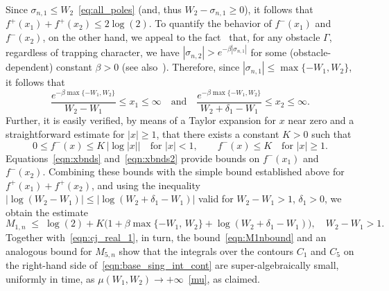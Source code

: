\documentclass[11pt]{article}
\theoremstyle{plain}
\theoremstyle{remark}
\begin{document}
Since $\sigma_{n,1} \le W_2$~\eqref{eq:all_poles} (and, thus
$W_2 -\sigma_{n,1}\geq 0$), it follows that
$f^+(x_1) + f^+(x_2) \le 2\log(2)$. To quantify the behavior of
$f^-(x_1)$ and $f^-(x_2)$, on the other hand, we appeal to the
fact~\cite{burq1998decroissance} that, for any obstacle $\Gamma$,
regardless of trapping character, we have
$|\sigma_{n,2}| > e^{-\beta |\sigma_{n,1}|}$ for some (obstacle-dependent)
constant $\beta > 0$ (see
also~\cite[Sec. 2.4]{zworski2017mathematical}). Therefore, since
$|\sigma_{n,1}|\leq \max\{-W_1, W_2\}$, it follows that
\begin{equation}\label{eqn:xbnds}
    \frac{e^{-\beta \max\{-W_1, W_2\}}}{W_2 - W_1} \le x_1 \le \infty \quad \text{and} \quad \frac{e^{-\beta \max\{-W_1, W_2\}}}{W_2 + \delta_1 - W_1} \le x_2 \le \infty.
\end{equation}
Further, it is easily verified, by means of a Taylor expansion for $x$ near zero
and a straightforward estimate for $|x|\geq 1$, that there exists a
constant $K > 0$ such that
\begin{equation}\label{eqn:xbnds2}
 0 \leq f^-(x) \leq K \, \big|\log |x|\big| 
 \quad \text{for } |x| < 1,
 \qquad 
 f^-(x) \leq K 
 \quad \text{for } |x| \geq 1.
\end{equation}
Equations~\eqref{eqn:xbnds} and~\eqref{eqn:xbnds2} provide bounds on
$f^-(x_1)$ and $f^-(x_2)$. Combining these bounds with the simple
bound established above for $f^+(x_1) + f^+(x_2)$, and using the
inequality $|\log(W_2 - W_1)| \leq |\log(W_2 + \delta_1 - W_1)|$ valid for
$W_2-W_1 > 1$, $\delta_1>0$, we obtain the estimate
\begin{equation}\label{eqn:M1nbound}
  M_{1,n} \;\leq\; 
  \log(2) + K \Big(1 + \beta \max\{-W_1,\, W_2\} 
  + \log(W_2 + \delta_1 - W_1)\Big),
  \quad W_2 - W_1 > 1.
\end{equation}
Together with~\eqref{eqn:cj_real_1}, in turn, the
bound~\eqref{eqn:M1nbound} and an analogous bound for $M_{5,n}$ show
that the integrals over the contours $C_1$ and $C_5$ on the right-hand
side of~\eqref{eqn:base_sing_int_cont} are super-algebraically small,
uniformly in time, as $\mu(W_1,W_2)\to +\infty$~\eqref{mu}, as
claimed.
\end{document}
